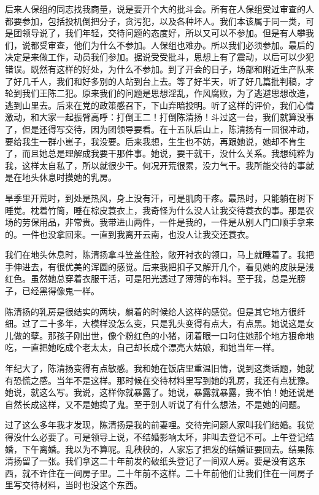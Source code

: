  后来人保组的同志找我商量，说是要开个大的批斗会。所有在人保组受过审查的人都要参加，包括投机倒把分子，贪污犯，以及各种坏人。我们本该属于同一类，可是团领导说了，我们年轻，交待问题的态度好，所以又可以不参加。但是有人攀我们，说都受审查，他们为什么不参加。人保组也难办。所以我们必须参加。最后的决定是来做工作，动员我们参加。据说受受批斗，思想上有了震动，以后可以少犯错误。既然有这样的好处，为什么不参加。到了开会的日子，场部和附近生产队来了好几千人，我们和好多别的人站到台上去。等了好半天，听了好几篇批判稿，才轮到我们王陈二犯。原来我们的问题是思想淫乱，作风腐败，为了逃避思想改造，逃到山里去。后来在党的政策感召下，下山弃暗投明。听了这样的评价，我们心情激动，和大家一起振臂高呼：打倒王二！打倒陈清扬！斗过这一台，我们就算没事了，但是还得写交待，因为团领导要看。在十五队后山上，陈清扬有一回很冲动，要给我生一群小崽子，我没要。后来我想，生生也不妨，再跟她说，她却不肯生了，而且她总是理解成我要干那件事。她说，要干就干，没什么关系。我想纯粹为我，这样太自私了，所以就很少干。何况开荒很累，没力气干。我所能交待的事就是在地头休息时摸她的乳房。 
 
 旱季里开荒时，到处是热风，身上没有汗，可是肌肉干疼。最热时，只能躺在树下睡觉。枕着竹筒，睡在棕皮蓑衣上，我奇怪为什么没人让我交待蓑衣的事。那是农场的劳保用品，非常贵。我带进山两件，一件是我的，一件是从别人门口顺手拿来的。一件也没拿回来。一直到我离开云南，也没人让我交还蓑衣。 
 
 我们在地头休息时，陈清扬拿斗笠盖住脸，敞开衬衣的领口，马上就睡着了。我把手伸进去，有很优美的浑圆的感觉。后来我把扣子又解开几个，看见她的皮肤是浅红色。虽然她总穿着衣服干活，可是阳光透过了薄薄的布料。至于我，总是光膀子，已经黑得像鬼一样。 
 
 陈清扬的乳房是很结实的两块，躺着的时候给人这样的感觉。但是其它地方很纤细。过了二十多年，大模样没怎么变，只是乳头变得有点大，有点黑。她说这是女儿做的孽。那孩子刚出世，像个粉红色的小猪，闭着眼一口叼住她那个地方狠命地吃，一直把她吃成个老太太，自己却长成个漂亮大姑娘，和她当年一样。 
 
 年纪大了，陈清扬变得有点敏感。我和她在饭店里重温旧情，说到这类话题，她就有恐慌之感。当年不是这样。那时候在交待材料里写到她的乳房，我还有点犹豫。她说，就这么写。我说，这样你就暴露了。她说，暴露就暴露，我不怕！她还说是自然长成这样，又不是她捣了鬼。至于别人听说了有什么想法，不是她的问题。 
 
 过了这么多年我才发现，陈清扬是我的前妻哩。交待完问题人家叫我们结婚。我觉得没什么必要了。可是领导上说，不结婚影响太坏，非叫去登记不可。上午登记结婚，下午离婚。我以为不算呢。乱秧秧的，人家忘了把发的结婚证要回去。结果陈清扬留了一张。我们拿这二十年前发的破纸头登记了一间双人房。要是没有这东西，就不许住在一间房子里。二十年前不这样。二十年前他们让我们住在一间房子里写交待材料，当时也没这个东西。 
 
